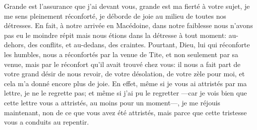 Grande est l’assurance que j’ai devant vous,
	grande est ma fierté à votre sujet,
	je me sens pleinement réconforté,
	je déborde de joie au milieu de toutes nos détresses.
En fait, à notre arrivée en Macédoine,
	dans notre faiblesse nous n’avons pas eu le moindre répit
	mais nous étions dans la détresse à tout moment:
	au-dehors, des conflits, et au-dedans, des craintes.
Pourtant, Dieu, lui qui réconforte les humbles,
	nous a réconfortés par la venue de Tite,
	et non seulement par sa venue,
		mais par le réconfort qu’il avait trouvé chez vous:
	il nous a fait part de votre grand désir de nous revoir,
	de votre désolation, de votre zèle pour moi,
	et cela m’a donné encore plus de joie.
En effet, même si je vous ai attristés par ma lettre, je ne le regrette pas;
	et même si j’ai pu le regretter
	---car je vois bien que cette lettre vous a attristés,
		au moins pour un moment---,
	je me réjouis maintenant, non de ce que vous avez été attristés,
	mais parce que cette tristesse vous a conduits au repentir.
